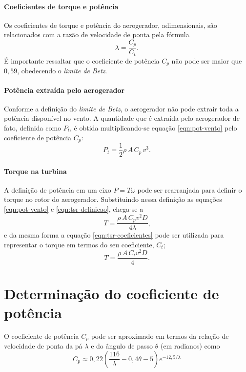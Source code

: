 \documentclass{article}
\begin{document}
	\paragraph{Coeficientes de torque e potência}
	Os coeficientes de torque e potência do aerogerador, adimensionais, são relacionados com a razão de velocidade de ponta pela fórmula
	\begin{equation} \label{eqn:tsr-coeficientes}
		\lambda = \frac{C_p}{C_t} \text{.}
	\end{equation}
	É importante ressaltar que o coeficiente de potência $C_p$ não pode ser maior que $0,59$, obedecendo o \emph{limite de Betz}.

	\paragraph{Potência extraída pelo aerogerador}
	Conforme a definição do \emph{limite de Betz}, o aerogerador não pode extrair toda a potência disponível no vento.
	A quantidade que é extraída pelo aerogerador de fato, definida como $P_t$, é obtida multiplicando-se equação \ref{eqn:pot-vento} pelo coeficiente de potência $C_p$:
	\begin{equation} \label{eqn:pot-extraida-turbina}
		P_t = \frac{1}{2}\rho\,A\,C_p\,v^3 \text{.}
	\end{equation}
	
	\paragraph{Torque na turbina}
	A definição de potência em um eixo $P = T\omega$ pode ser rearranjada para definir o torque no rotor do aerogerador.
	Substituindo nessa definição as equações \ref{eqn:pot-vento} e \ref{eqn:tsr-definicao}, chega-se a
	\begin{equation} \label{eqn:torque-cp}
		T = \frac{\rho\,A\,C_p v^2 D}{4\lambda} \text{,}
	\end{equation}
	e da mesma forma a equação \ref{eqn:tsr-coeficientes} pode ser utilizada para representar o torque em termos do seu coeficiente, $C_t$;
	\begin{equation} \label{eqn:torque-ct}
		T = \frac{\rho\,A\,C_t v^2 D}{4} \text{.}
	\end{equation}
	
	\section{Determinação do coeficiente de potência}
	O coeficiente de potência $C_p$ pode ser aproximado em termos da relação de velocidade de ponta da pá $\lambda$ e do ângulo de passo $\theta$ (em radianos) como \cite{pinto:2014}
	\begin{equation} \label{eqn:aprox-cp}
		C_p \approx 0,22
		\left( \frac{116}{\lambda} - 0,4\theta - 5 \right)
		e^{-12,5/\lambda}
	\end{equation}
	
\end{document}
